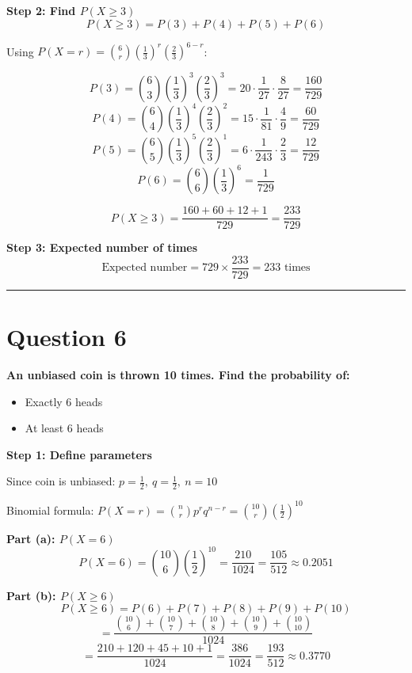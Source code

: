 \documentclass[12pt,a4paper]{article}
\begin{document}
\textbf{Step 2: Find $P(X \geq 3)$}
\[
P(X \geq 3) = P(3) + P(4) + P(5) + P(6)
\]

Using $P(X=r) = \binom{6}{r}\left(\frac{1}{3}\right)^r\left(\frac{2}{3}\right)^{6-r}$:

\[
P(3) = \binom{6}{3}\left(\frac{1}{3}\right)^3\left(\frac{2}{3}\right)^3 = 20 \cdot \frac{1}{27} \cdot \frac{8}{27} = \frac{160}{729}
\]
\[
P(4) = \binom{6}{4}\left(\frac{1}{3}\right)^4\left(\frac{2}{3}\right)^2 = 15 \cdot \frac{1}{81} \cdot \frac{4}{9} = \frac{60}{729}
\]
\[
P(5) = \binom{6}{5}\left(\frac{1}{3}\right)^5\left(\frac{2}{3}\right)^1 = 6 \cdot \frac{1}{243} \cdot \frac{2}{3} = \frac{12}{729}
\]
\[
P(6) = \binom{6}{6}\left(\frac{1}{3}\right)^6 = \frac{1}{729}
\]

\[
P(X \geq 3) = \frac{160 + 60 + 12 + 1}{729} = \frac{233}{729}
\]

\textbf{Step 3: Expected number of times}
\[
\text{Expected number} = 729 \times \frac{233}{729} = \boxed{233 \text{ times}}
\]

\vspace{1em}\hrule\vspace{1em}

\section{Question 6}
\textbf{An unbiased coin is thrown 10 times. Find the probability of:}
\begin{itemize}[noitemsep]
\item[(a)] Exactly 6 heads
\item[(b)] At least 6 heads
\end{itemize}

\textbf{Step 1: Define parameters}

Since coin is unbiased: $p = \frac{1}{2},\ q = \frac{1}{2},\ n = 10$

Binomial formula: $P(X=r) = \binom{n}{r}p^r q^{n-r} = \binom{10}{r}\left(\frac{1}{2}\right)^{10}$

\textbf{Part (a): $P(X = 6)$}
\[
P(X=6) = \binom{10}{6}\left(\frac{1}{2}\right)^{10} = \frac{210}{1024} = \boxed{\frac{105}{512} \approx 0.2051}
\]

\textbf{Part (b): $P(X \geq 6)$}
\[
P(X \geq 6) = P(6) + P(7) + P(8) + P(9) + P(10)
\]
\[
= \frac{\binom{10}{6}+\binom{10}{7}+\binom{10}{8}+\binom{10}{9}+\binom{10}{10}}{1024}
\]
\[
= \frac{210 + 120 + 45 + 10 + 1}{1024} = \frac{386}{1024} = \boxed{\frac{193}{512} \approx 0.3770}
\]
\end{document}
